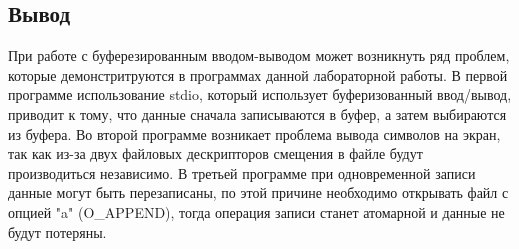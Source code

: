 \subsection*{Вывод}

При работе с буферезированным вводом-выводом может возникнуть ряд
проблем, которые демонстритруются в программах данной лабораторной работы.
В первой программе использование stdio, который использует буферизованный ввод/вывод, приводит к тому, что данные сначала записываются в буфер, а затем выбираются из буфера.
Во второй программе возникает проблема вывода символов на
экран, так как из-за двух файловых дескрипторов смещения в файле будут
производиться независимо. 
В третьей программе при одновременной записи данные могут быть перезаписаны, по этой причине необходимо открывать файл с опцией "a" (O\_APPEND), тогда операция записи станет атомарной и данные не будут потеряны.

